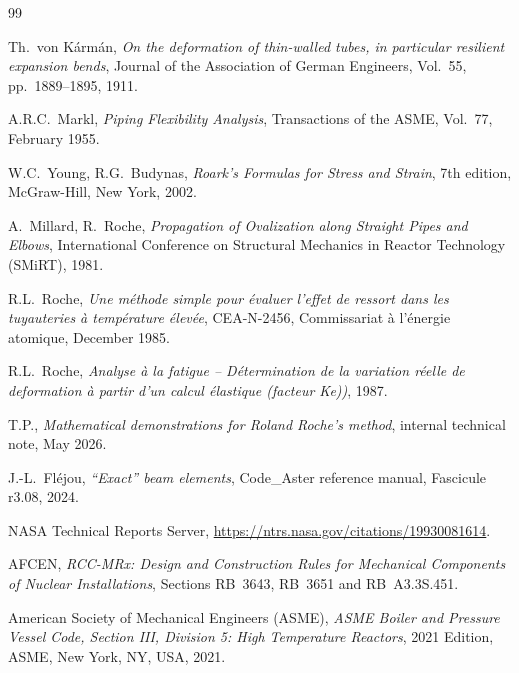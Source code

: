 \documentclass[10pt,a4paper]{article}
\begin{document}
\begin{thebibliography}{99}

Th.~von K\'arm\'an,
\emph{On the deformation of thin-walled tubes, in particular resilient expansion bends},
Journal of the Association of German Engineers, Vol.~55, pp.~1889--1895, 1911.

A.R.C.~Markl,
\emph{Piping Flexibility Analysis},
Transactions of the ASME, Vol.~77, February 1955.

W.C.~Young, R.G.~Budynas,
\emph{Roark's Formulas for Stress and Strain},
7th edition, McGraw-Hill, New York, 2002.

A.~Millard, R.~Roche,
\emph{Propagation of Ovalization along Straight Pipes and Elbows},
International Conference on Structural Mechanics in Reactor Technology (SMiRT), 1981.

R.L.~Roche,
\emph{Une m\'ethode simple pour \'{e}valuer l'effet de ressort dans les tuyauteries \`a temp\'erature \'{e}lev\'ee},
CEA-N-2456, Commissariat \`a l'\'energie atomique, December 1985.

R.L.~Roche,
\emph{Analyse à la fatigue – Détermination de la variation réelle de deformation à partir d’un calcul élastique (facteur Ke))},
1987.

T.P.,
\emph{Mathematical demonstrations for Roland Roche's method},
internal technical note, May 2026.

J.-L.~Fl\'ejou,
\emph{``Exact'' beam elements},
Code\_Aster reference manual, Fascicule r3.08, 2024.

NASA Technical Reports Server, \url{https://ntrs.nasa.gov/citations/19930081614}.

AFCEN, \emph{RCC-MRx: Design and Construction Rules for Mechanical Components of Nuclear Installations},
Sections RB~3643, RB~3651 and RB~A3.3S.451.



 American Society of Mechanical Engineers (ASME), \textit{ASME Boiler and Pressure Vessel Code, Section III, Division 5: High Temperature Reactors}, 2021 Edition, ASME, New York, NY, USA, 2021.



\end{thebibliography}
\end{document}
